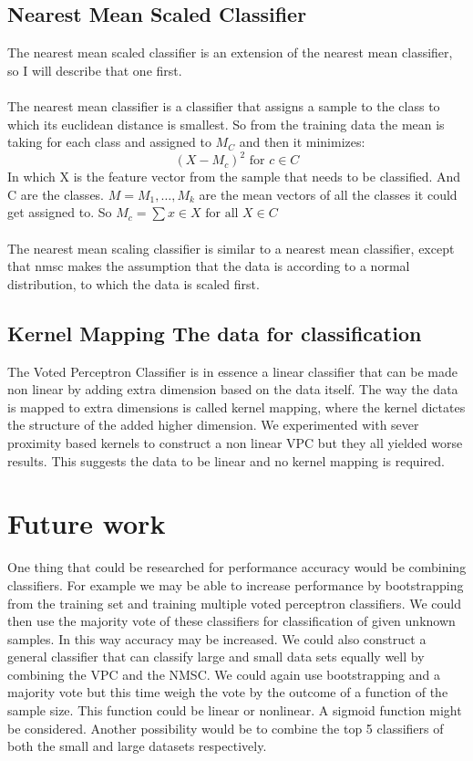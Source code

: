 \documentclass[%
        compressed,
        final,
        notitlepage,
        narroweqnarray,
        inline,
        twoside,
        ]{ieee}
\begin{document}
\subsection{Nearest Mean Scaled Classifier}
The nearest mean scaled classifier is an extension of the nearest mean
classifier, so I will describe that one first.\\\\
The nearest mean classifier is a classifier that assigns a sample to the class
to which its euclidean distance is smallest. So from the training data the mean
is taking for each class and assigned to $M_C$ and then it minimizes:
\begin{equation}
    (X - M_c)^2 \text{ for $c \in C$}
\end{equation}
In which X is the feature vector from the sample that needs to be classified.
And C are the classes. $M = {M_1, …, M_k}$ are the mean vectors of all the classes
it could get assigned to.
So $M_c = \sum{x \in X \text{ for all $X \in C$}}$\\\\
The nearest mean scaling classifier is similar to a nearest mean classifier,
except that nmsc makes the assumption that the data is according to a normal
distribution, to which the data is scaled first.

\subsection{Kernel Mapping The data for classification}
The Voted Perceptron Classifier is in essence a linear classifier that can be made non linear by adding extra dimension based on the data itself. The way the data is mapped to extra dimensions is called kernel mapping, where the kernel dictates the structure of the added higher dimension. We experimented with sever proximity based kernels to construct a non linear VPC but they all yielded worse results. This suggests the data to be linear and no kernel mapping is required.

\section{Future work} 
One thing that could be researched for performance accuracy would be combining
classifiers.  For example we may be able to increase performance by
bootstrapping from the training set and training multiple voted perceptron
classifiers. We could then use the majority vote of these classifiers for
classification of given unknown samples. In this way accuracy may be increased.
We could also construct a general classifier that can classify large and small
data sets equally well by combining the VPC and the NMSC. We could again use
bootstrapping and a majority vote but this time weigh the vote by the outcome of
a function of the sample size. This function could be linear or nonlinear. A
sigmoid function might be considered. Another possibility would be to combine
the top 5 classifiers of both the small and large datasets respectively. 
\end{document}
